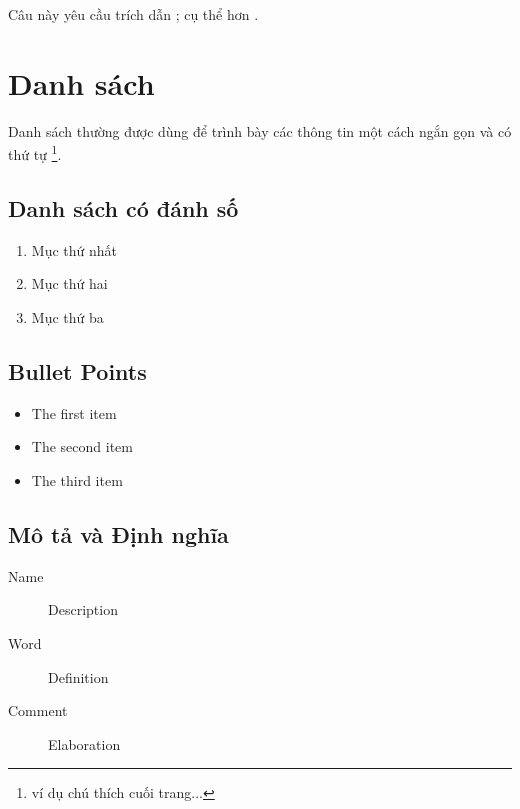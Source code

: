 \documentclass[11pt,fleqn]{book} %
\begin{document}
Câu này yêu cầu trích dẫn \cite{book_key}; cụ thể hơn \cite[122]{article_key}.


\section{Danh sách}

Danh sách thường được dùng để trình bày các thông tin một cách ngắn gọn và có thứ tự \footnote{ví dụ chú thích cuối trang...}.

\subsection{Danh sách có đánh số}

\begin{enumerate}
\item Mục thứ nhất
\item Mục thứ hai
\item Mục thứ ba
\end{enumerate}

\subsection{Bullet Points}

\begin{itemize}
\item The first item
\item The second item
\item The third item
\end{itemize}

\subsection{Mô tả và Định nghĩa}

\begin{description}
\item[Name] Description
\item[Word] Definition
\item[Comment] Elaboration
\end{description}

\end{document}
